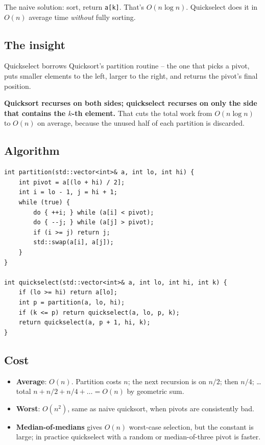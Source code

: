 \documentclass[11pt]{article}
\begin{document}
The naive solution: sort, return \texttt{a[k]}. That's $O(n \log n)$. Quickselect does it in $O(n)$ average time \emph{without} fully sorting.

\subsection*{The insight}

Quickselect borrows Quicksort's partition routine -- the one that picks a pivot, puts smaller elements to the left, larger to the right, and returns the pivot's final position.

\begin{ideabox}
\textbf{Quicksort recurses on both sides; quickselect recurses on only the side that contains the $k$-th element.} That cuts the total work from $O(n \log n)$ to $O(n)$ on average, because the unused half of each partition is discarded.
\end{ideabox}

\subsection*{Algorithm}

\begin{lstlisting}[basicstyle=\ttfamily\small,frame=single]
int partition(std::vector<int>& a, int lo, int hi) {
    int pivot = a[(lo + hi) / 2];
    int i = lo - 1, j = hi + 1;
    while (true) {
        do { ++i; } while (a[i] < pivot);
        do { --j; } while (a[j] > pivot);
        if (i >= j) return j;
        std::swap(a[i], a[j]);
    }
}

int quickselect(std::vector<int>& a, int lo, int hi, int k) {
    if (lo >= hi) return a[lo];
    int p = partition(a, lo, hi);
    if (k <= p) return quickselect(a, lo, p, k);
    return quickselect(a, p + 1, hi, k);
}
\end{lstlisting}

\subsection*{Cost}

\begin{itemize}[leftmargin=*]
    \item \textbf{Average}: $O(n)$. Partition costs $n$; the next recursion is on $n/2$; then $n/4$; \ldots total $n + n/2 + n/4 + \ldots = O(n)$ by geometric sum.
    \item \textbf{Worst}: $O(n^2)$, same as naive quicksort, when pivots are consistently bad.
    \item \textbf{Median-of-medians} gives $O(n)$ worst-case selection, but the constant is large; in practice quickselect with a random or median-of-three pivot is faster.
\end{itemize}
\end{document}
